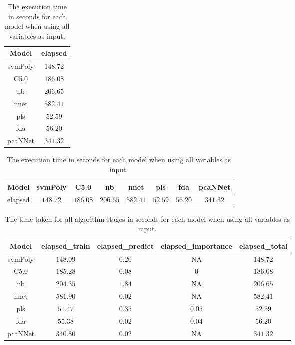 \begin{table}[!ht]
	\centering
	\begin{tabular}{|c|c|}
		\hline
		Model & elapsed \\ \hline
		svmPoly & $148.72$ \\ \hline
		C5.0 & $186.08$ \\ \hline
		nb & $206.65$ \\ \hline
		nnet & $582.41$ \\ \hline
		pls & $52.59$ \\ \hline
		fda & $56.20$ \\ \hline
		pcaNNet & $341.32$ \\ \hline
	\end{tabular}
	\caption{The execution time in seconds for each model when using all variables as input.}
	\label{tab:time:all:total}
\end{table}

\begin{table}[!ht]
	\centering
	\begin{tabular}{|c|c|c|c|c|c|c|c|}
		\hline
		Model & svmPoly & C5.0 & nb & nnet & pls & fda & pcaNNet \\ \hline
		elapsed & $148.72$ & $186.08$ & $206.65$ & $582.41$ & $52.59$ & $56.20$ & $341.32$ \\ \hline
	\end{tabular}
	\caption{The execution time in seconds for each model when using all variables as input.}
	\label{tab:time:reverse:all:total}
\end{table}

\begin{table}[!ht]
	\centering
	\begin{tabular}{|c|c|c|c|c|}
		\hline
		Model & elapsed_train & elapsed_predict & elapsed_importance & elapsed_total \\ \hline
		svmPoly & $148.09$ & $0.20$ & NA & $148.72$ \\ \hline
		C5.0 & $185.28$ & $0.08$ & $0$ & $186.08$ \\ \hline
		nb & $204.35$ & $1.84$ & NA & $206.65$ \\ \hline
		nnet & $581.90$ & $0.02$ & NA & $582.41$ \\ \hline
		pls & $51.47$ & $0.35$ & $0.05$ & $52.59$ \\ \hline
		fda & $55.38$ & $0.02$ & $0.04$ & $56.20$ \\ \hline
		pcaNNet & $340.80$ & $0.02$ & NA & $341.32$ \\ \hline
	\end{tabular}
	\caption{The time taken for all algorithm stages in seconds for each model when using all variables as input.}
	\label{tab:time:all}
\end{table}

